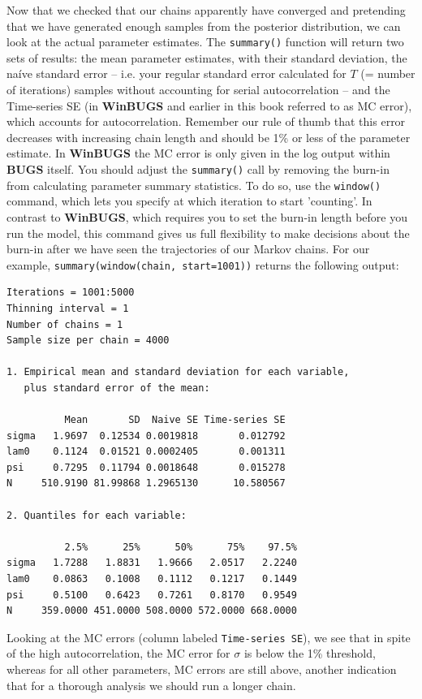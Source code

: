 Now that we checked that our chains apparently have converged and pretending
that we have generated enough samples from the posterior distribution, we
can look at the actual parameter estimates. The \verb#summary()# function
will return two sets of results: the mean parameter estimates, with their standard deviation, the na\'{i}ve standard error -- i.e. your regular standard error calculated for $T$ (= number of iterations)
samples without
accounting for serial autocorrelation -- and the
Time-series SE (in {\bf WinBUGS}
and earlier in this book referred to as MC error), which accounts for
autocorrelation. Remember our rule of thumb that this error
decreases with increasing chain length and should be 1\% or less of the
parameter estimate. In {\bf WinBUGS} the MC error is only given in the log
output within {\bf BUGS} itself.
You should adjust the \verb#summary()# call by removing the burn-in from
calculating parameter summary statistics. To do so, use the \verb#window()#
command, which lets you specify at which iteration to start
'counting'. In contrast to {\bf WinBUGS}, which requires you to set the
burn-in length before you run the model, this command gives us full
flexibility to make decisions about the burn-in after we have seen the
trajectories of our Markov chains. For our example,
\verb#summary(window(chain, start=1001))# returns the following output:

{\small
\begin{verbatim}
Iterations = 1001:5000
Thinning interval = 1
Number of chains = 1
Sample size per chain = 4000

1. Empirical mean and standard deviation for each variable,
   plus standard error of the mean:

          Mean       SD  Naive SE Time-series SE
sigma   1.9697  0.12534 0.0019818       0.012792
lam0    0.1124  0.01521 0.0002405       0.001311
psi     0.7295  0.11794 0.0018648       0.015278
N     510.9190 81.99868 1.2965130      10.580567

2. Quantiles for each variable:

          2.5%      25%      50%      75%    97.5%
sigma   1.7288   1.8831   1.9666   2.0517   2.2240
lam0    0.0863   0.1008   0.1112   0.1217   0.1449
psi     0.5100   0.6423   0.7261   0.8170   0.9549
N     359.0000 451.0000 508.0000 572.0000 668.0000
\end{verbatim}
}

Looking at the MC errors (column labeled \mbox{\tt Time-series SE}),
we see that in spite of the high autocorrelation, the MC error for
$\sigma$ is below the 1\% threshold, whereas for all other parameters,
MC errors are still above, another indication that for a thorough
analysis we should run a longer chain.

